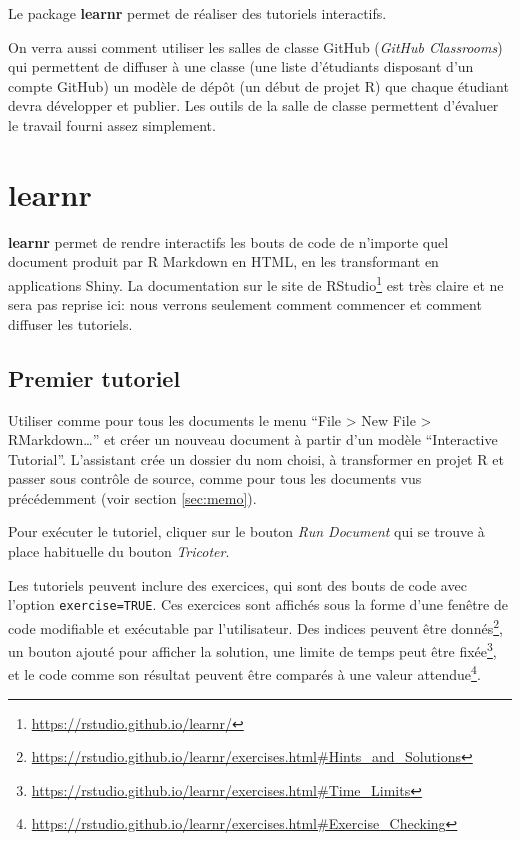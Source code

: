 \documentclass[
  11pt,
  french,
  a4paper,
  extrafontsizes,onecolumn,openright
  ]{memoir}
\begin{document}
Le package \textbf{learnr} permet de réaliser des tutoriels interactifs.

On verra aussi comment utiliser les salles de classe GitHub (\emph{GitHub Classrooms}) qui permettent de diffuser à une classe (une liste d'étudiants disposant d'un compte GitHub) un modèle de dépôt (un début de projet R) que chaque étudiant devra développer et publier.
Les outils de la salle de classe permettent d'évaluer le travail fourni assez simplement.

\hypertarget{learnr}{%
\section{learnr}\label{learnr}}

\textbf{learnr} permet de rendre interactifs les bouts de code de n'importe quel document produit par R Markdown en HTML, en les transformant en applications Shiny.
La documentation sur le site de RStudio\footnote{\url{https://rstudio.github.io/learnr/}} est très claire et ne sera pas reprise ici: nous verrons seulement comment commencer et comment diffuser les tutoriels.

\hypertarget{premier-tutoriel}{%
\subsection{Premier tutoriel}\label{premier-tutoriel}}

Utiliser comme pour tous les documents le menu ``File \textgreater{} New File \textgreater{} RMarkdown\ldots{}'' et créer un nouveau document à partir d'un modèle ``Interactive Tutorial''.
L'assistant crée un dossier du nom choisi, à transformer en projet R et passer sous contrôle de source, comme pour tous les documents vus précédemment (voir section \ref{sec:memo}).

Pour exécuter le tutoriel, cliquer sur le bouton \emph{Run Document} qui se trouve à place habituelle du bouton \emph{Tricoter}.

Les tutoriels peuvent inclure des exercices, qui sont des bouts de code avec l'option \texttt{exercise=TRUE}.
Ces exercices sont affichés sous la forme d'une fenêtre de code modifiable et exécutable par l'utilisateur.
Des indices peuvent être donnés\footnote{\url{https://rstudio.github.io/learnr/exercises.html\#Hints_and_Solutions}}, un bouton ajouté pour afficher la solution, une limite de temps peut être fixée\footnote{\url{https://rstudio.github.io/learnr/exercises.html\#Time_Limits}}, et le code comme son résultat peuvent être comparés à une valeur attendue\footnote{\url{https://rstudio.github.io/learnr/exercises.html\#Exercise_Checking}}.
\end{document}
